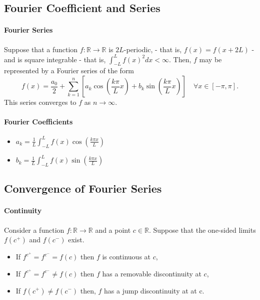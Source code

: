 \documentclass[12pt, letterpaper]{article}
\begin{document}
    \subsection{Fourier Coefficient and Series}

    \paragraph{Fourier Series}
    Suppose that a function \(f: \mathbb{R}\to \mathbb{R}\) is \(2L\)-periodic,
    - that is, \(f(x) = f(x+2L)\) - 
    and is square integrable - that is, \(\int_{-L}^{L}f(x)^2 dx < \infty\).
    Then, \(f\) may be represented by a Fourier series of the form
    \[
        f(x) =
        \frac{a_0}{2} + \sum_{k=1}^n
        \left[
            a_k \cos\left(\frac{k\pi}{L}x\right) + b_k \sin \left(\frac{k\pi}{L}x \right)
        \right]
        \quad
        \forall x\in [-\pi, \pi].
    \]
    This series converges to \(f\) as \(n\to \infty\).
    
    \paragraph{Fourier Coefficients}
    \begin{itemize}
        \item \(a_k = \frac{1}{L} \int_{-L}^{L} f(x) \cos\left( \frac{k\pi x}{L} \right)\)
        \item \(b_k = \frac{1}{L} \int_{-L}^{L} f(x) \sin\left( \frac{k\pi x}{L} \right)\)
    \end{itemize}
    
    \subsection{Convergence of Fourier Series}
    \paragraph{Continuity}
    Consider a function \(f: \mathbb{R}\to \mathbb{R}\) and a point \(c\in \mathbb{R}\).
    Suppose that the one-sided limits \(f(c^+)\) and \(f(c^-)\) exist.

    \begin{itemize}
        \item If \(f^{c^+} = f^{c^-} = f(c)\) then \(f\) is continuous at \(c\),
        \item If \(f^{c^+} = f^{c^-} \neq f(c)\) then \(f\) has a removable discontinuity at \(c\),
        \item If \(f(c^+) \neq f(c^-)\) then, \(f\) has a jump discontinuity at
        at c.
    \end{itemize}
\end{document}
